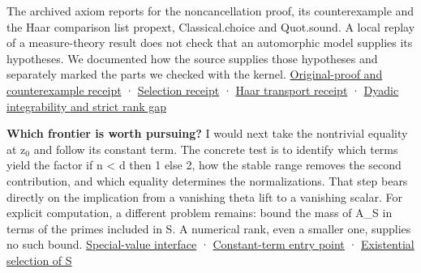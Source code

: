 \documentclass[11pt,letterpaper]{article}
\begin{document}
The archived axiom reports for the noncancellation proof, its counterexample and the Haar comparison list {\ttfamily\small propext}, {\ttfamily\small Classical.\allowbreak{}choice} and {\ttfamily\small Quot.\allowbreak{}sound}. A local replay of a measure-theory result does not check that an automorphic model supplies its hypotheses. We documented how the source supplies those hypotheses and separately marked the parts we checked with the kernel. \href{https://github.com/nousentllc/riemann-hypothesis/blob/003f8090b9894fb955d0925ea1b7f7da64a823c3/research/uriel/experiments/stable-range-theta/verification/kernel_receipt.json}{Original-proof and counterexample receipt} · \href{https://github.com/nousentllc/riemann-hypothesis/blob/003f8090b9894fb955d0925ea1b7f7da64a823c3/research/uriel/experiments/stable-range-theta/verification/tail_selection_receipt.json}{Selection receipt} · \href{https://github.com/nousentllc/riemann-hypothesis/blob/003f8090b9894fb955d0925ea1b7f7da64a823c3/research/uriel/experiments/stable-range-theta/haar_tail_receipt.json}{Haar transport receipt} · \href{https://github.com/nousentllc/riemann-hypothesis/blob/003f8090b9894fb955d0925ea1b7f7da64a823c3/research/uriel/experiments/stable-range-theta/verification/height_receipt.json}{Dyadic integrability and strict rank gap}

\textbf{Which frontier is worth pursuing?} I would next take the nontrivial equality at z\ensuremath{{}_{0}} and follow its constant term. The concrete test is to identify which terms yield the factor {\ttfamily\small if n < d then 1 else 2}, how the stable range removes the second contribution, and which equality determines the normalizations. That step bears directly on the implication from a vanishing theta lift to a vanishing scalar. For explicit computation, a different problem remains: bound the mass of A\_S in terms of the primes included in S. A numerical rank, even a smaller one, supplies no such bound. \href{https://github.com/nousentllc/riemann-hypothesis/blob/40e56bab026552e089d7afcfeff08d2defb9c005/src/Development/AutomorphicArithmetic/Foundations/GaloisRepresentations/ThetaParseval/ThetaKernels/ThkBaseStmtX.lean\#L33-L42}{Special-value interface} · \href{https://github.com/nousentllc/riemann-hypothesis/blob/40e56bab026552e089d7afcfeff08d2defb9c005/src/Development/AutomorphicArithmetic/Foundations/GaloisRepresentations/ThetaParseval/ThetaKernels/SiegelWeilFinFinal.lean\#L15}{Constant-term entry point} · \href{https://github.com/nousentllc/riemann-hypothesis/blob/40e56bab026552e089d7afcfeff08d2defb9c005/src/Development/AutomorphicArithmetic/Foundations/GaloisRepresentations/ThetaParseval/ThetaKernels/TPGTail.lean\#L125-L140}{Existential selection of S}
\end{document}
